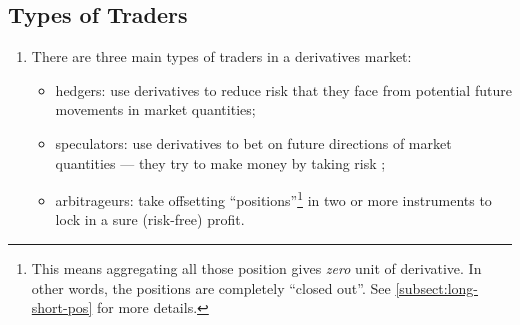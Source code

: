 \subsection{Types of Traders}
\begin{enumerate}
\item There are three main types of traders in a derivatives market:
\begin{itemize}
\item hedgers: use derivatives to reduce risk  that they face
from potential future movements  in market quantities;
\item speculators: use derivatives to bet  on future directions
of market quantities  --- they try to make money
 by taking risk ;
\item arbitrageurs: take offsetting ``positions''\footnote{This means
aggregating all those position gives \emph{zero} unit of derivative. In other
words, the positions are completely ``closed out''. See
\cref{subsect:long-short-pos} for more details.} in two or more instruments to
lock in a sure (risk-free) profit.
\end{itemize}
\end{enumerate}

